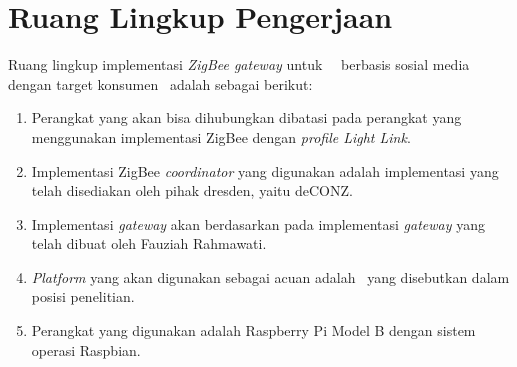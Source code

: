 \section{Ruang Lingkup Pengerjaan}
Ruang lingkup implementasi \textit{ZigBee gateway} untuk \plat~\iot~berbasis sosial media dengan target konsumen \eu~adalah sebagai berikut:
\begin{enumerate}
	\item Perangkat yang akan bisa dihubungkan dibatasi pada perangkat yang menggunakan implementasi ZigBee dengan \textit{profile Light Link}.
	\item Implementasi ZigBee \textit{coordinator} yang digunakan adalah implementasi yang telah disediakan oleh pihak dresden, yaitu deCONZ.
	\item Implementasi \textit{gateway} akan berdasarkan pada implementasi \textit{gateway} yang telah dibuat oleh Fauziah Rahmawati\cite{SkripsiFarah}.
	\item \textit{Platform} yang akan digunakan sebagai acuan adalah \plat~yang disebutkan dalam posisi penelitian.
	\item Perangkat yang digunakan adalah Raspberry Pi Model B dengan sistem operasi Raspbian.
\end{enumerate}

